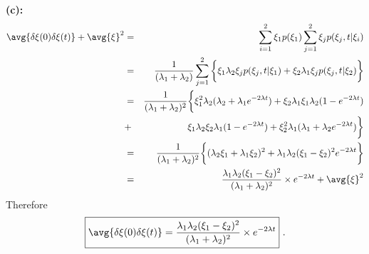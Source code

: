 \textbf{(c):}
\begin{eqnarray}
\avg{\delta \xi(0) \delta \xi(t)} + \avg{\xi}^2 &=& \sum_{i=1}^{2} \xi_1 p(\xi_1) \sum_{j=1}^{2}  \xi_j p(\xi_j, t| \xi_i) \nonumber \\
&=& \frac{1}{(\lambda_1 + \lambda_2)}\sum_{j=1}^{2} \bigg\{  \xi_1 \lambda_2 \xi_j p(\xi_j, t| \xi_1) + \xi_2 \lambda_1 \xi_j p(\xi_j, t| \xi_2) \bigg\} \nonumber \\
&=& \frac{1}{(\lambda_1 + \lambda_2)^2} \bigg\{  \xi_1^2 \lambda_2 (\lambda_2 + \lambda_1 e^{-2 \lambda t}) + \xi_2 \lambda_1 \xi_1 \lambda_2 (1-e^{-2 \lambda t}) \nonumber \\
&+& \xi_1 \lambda_2 \xi_2 \lambda_1 (1-e^{-2 \lambda t}) + \xi_2^2 \lambda_1 (\lambda_1 + \lambda_2 e^{-2 \lambda t}) \bigg\} \nonumber \\
&=& \frac{1}{(\lambda_1 + \lambda_2)^2} \bigg\{ (\lambda_2 \xi_1 + \lambda_1 \xi_2)^2  + \lambda_1 \lambda_2 (\xi_1-\xi_2)^2 e^{- 2 \lambda t} \bigg\} \nonumber  \\
&=& \frac{\lambda_1 \lambda_2 (\xi_1-\xi_2)^2}{(\lambda_1 + \lambda_2)^2} \times e^{- 2 \lambda t} + \avg{\xi}^2
\end{eqnarray}
Therefore
\begin{equation}
\boxed{\avg{\delta \xi(0) \delta \xi(t)} = \frac{\lambda_1 \lambda_2 (\xi_1-\xi_2)^2}{(\lambda_1 + \lambda_2)^2} \times e^{- 2 \lambda t}}~.
\end{equation}



